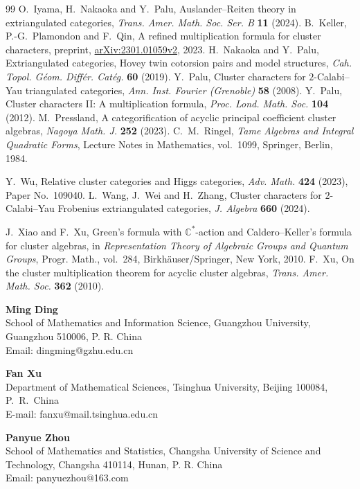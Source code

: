 \documentclass[11pt,reqno]{article}
\numberwithin{equation}{section}
\theoremstyle{definition}
\begin{document}
\begin{thebibliography}{99}
O.~Iyama, H.~Nakaoka and Y.~Palu,
Auslander--Reiten theory in extriangulated categories,
\emph{Trans. Amer. Math. Soc. Ser. B} \textbf{11} (2024).
B.~Keller, P.-G.~Plamondon and F.~Qin,
A refined multiplication formula for cluster characters,
preprint, \href{https://arxiv.org/abs/2301.01059v2}{arXiv:2301.01059v2}, 2023.
H.~Nakaoka and Y.~Palu,
Extriangulated categories, Hovey twin cotorsion pairs and model structures,
\emph{Cah. Topol. G\'eom. Diff\'er. Cat\'eg.} \textbf{60} (2019).
Y.~Palu,
Cluster characters for $2$-Calabi--Yau triangulated categories,
\emph{Ann. Inst. Fourier (Grenoble)} \textbf{58} (2008).
Y.~Palu,
Cluster characters II: A multiplication formula,
\emph{Proc. Lond. Math. Soc.} \textbf{104} (2012).
M.~Pressland,
A categorification of acyclic principal coefficient cluster algebras,
\emph{Nagoya Math. J.} \textbf{252} (2023).
C.~M.~Ringel,
\emph{Tame Algebras and Integral Quadratic Forms},
Lecture Notes in Mathematics, vol.~1099, Springer, Berlin, 1984.

Y.~Wu,
Relative cluster categories and Higgs categories,
\emph{Adv. Math.} \textbf{424} (2023), Paper No.~109040.
L.~Wang, J.~Wei and H.~Zhang,
Cluster characters for $2$-Calabi--Yau Frobenius extriangulated categories,
\emph{J. Algebra} \textbf{660} (2024).

J.~Xiao and F.~Xu,
Green's formula with $\mathbb C^*$-action and Caldero--Keller's formula for cluster algebras,
in \emph{Representation Theory of Algebraic Groups and Quantum Groups},
Progr. Math., vol.~284, Birkh\"auser/Springer, New York, 2010.
F.~Xu,
On the cluster multiplication theorem for acyclic cluster algebras,
\emph{Trans. Amer. Math. Soc.} \textbf{362} (2010).
\end{thebibliography}

\hspace{-6.5mm}
\textbf{Ming Ding}\\[1mm]
School of Mathematics and Information Science,
Guangzhou University, Guangzhou 510006, P. R. China\\[1mm]
Email: dingming@gzhu.edu.cn
\vspace{3mm}

\hspace{-6.5mm}
\textbf{Fan Xu}\\[1mm]
Department of Mathematical Sciences,
Tsinghua University,
Beijing 100084, P.~R.~China\\[1mm]
E-mail: fanxu@mail.tsinghua.edu.cn
\vspace{3mm}


\hspace{-6.5mm}
\textbf{Panyue Zhou}\\[1mm]
School of Mathematics and Statistics, Changsha University of Science and Technology, Changsha 410114, Hunan, P. R. China\\[1mm]
Email: panyuezhou@163.com\\
\end{document}
